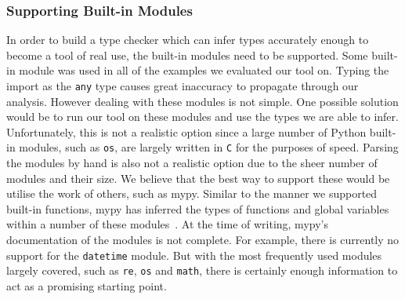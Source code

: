 \documentclass[12pt, titlepage]{article}
\begin{document}
\subsubsection*{Supporting Built-in Modules}
In order to build a type checker which can infer types accurately enough to become a tool of real use, the built-in modules need to be supported. Some built-in module was used in all of the examples we evaluated our tool on. Typing the import as the \texttt{any} type causes great inaccuracy to propagate through our analysis. However dealing with these modules is not simple. One possible solution would be to run our tool on these modules and use the types we are able to infer. Unfortunately, this is not a realistic option since a large number of Python built-in modules, such as \texttt{os}, are largely written in \texttt{C} for the purposes of speed. Parsing the modules by hand is also not a realistic option due to the sheer number of modules and their size. We believe that the best way to support these would be utilise the work of others, such as mypy. Similar to the manner we supported built-in functions, mypy has inferred the types of functions and global variables within a number of these modules~\cite{mypy}. At the time of writing, mypy's documentation of the modules is not complete. For example, there is currently no support for the \texttt{datetime} module. But with the most frequently used modules largely covered, such as \texttt{re}, \texttt{os} and \texttt{math}, there is certainly enough information to act as a promising starting point.
\end{document}
